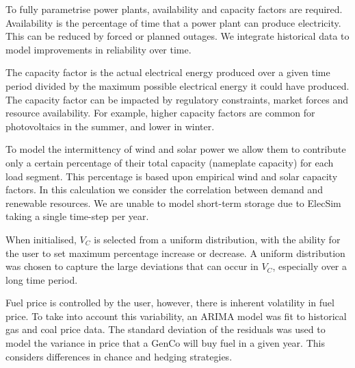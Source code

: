 To fully parametrise power plants, availability and capacity factors are required. Availability is the percentage of time that a power plant can produce electricity. This can be reduced by forced or planned outages. We integrate historical data to model improvements in reliability over time.

The capacity factor is the actual electrical energy produced over a given time period divided by the maximum possible electrical energy it could have produced. The capacity factor can be impacted by regulatory constraints, market forces and resource availability. For example, higher capacity factors are common for photovoltaics in the summer, and lower in winter. 

To model the intermittency of wind and solar power we allow them to contribute only a certain percentage of their total capacity (nameplate capacity) for each load segment. This percentage is based upon empirical wind and solar capacity factors. In this calculation we consider the correlation between demand and renewable resources. We are unable to model short-term storage due to ElecSim taking a single time-step per year. 

When initialised, $V_C$ is selected from a uniform distribution, with the ability for the user to set maximum percentage increase or decrease. A uniform distribution was chosen to capture the large deviations that can occur in $V_C$, especially over a long time period. \vphantom{By doing this, the variance in costs between individual power plants for processes such as preventative and corrective maintenance, labour costs and skill, health and safety and chance are different per plant instant.}

Fuel price is controlled by the user, however, there is inherent volatility in fuel price. To take into account this variability, an ARIMA \cite{ARIMA} model was fit to historical gas and coal price data. The standard deviation of the residuals was used to model the variance in price that a GenCo will buy fuel in a given year. This considers differences in chance and hedging strategies.



